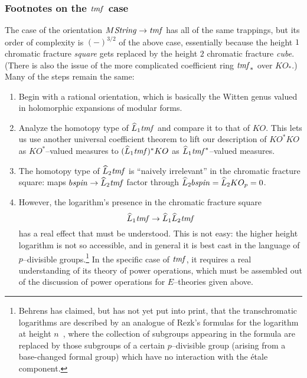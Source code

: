\subsubsection{Footnotes on the \(\mathit{tmf}\) case}

The case of the orientation \(M\mathit{String} \to \mathit{tmf}\) has all of the same trappings, but its order of complexity is \((-)^{3/2}\) of the above case, essentially because the height \(1\) chromatic fracture \emph{square} gets replaced by the height \(2\) chromatic fracture \emph{cube}.  (There is also the issue of the more complicated coefficient ring \(\mathit{tmf}_*\) over \(KO_*\).)  Many of the steps remain the same:
\begin{enumerate}
    \item Begin with a rational orientation, which is basically the Witten genus valued in holomorphic expansions of modular forms.
    \item Analyze the homotopy type of \(\widehat L_1 \mathit{tmf}\) and compare it to that of \(KO\).  This lets us use another universal coefficient theorem to lift our description of \(KO^* KO\) as \(KO^*\)--valued measures to \((\widehat L_1 \mathit{tmf})^* KO\) as \(\widehat L_1 \mathit{tmf}^*\)--valued measures.
    \item The homotopy type of \(\widehat L_2 \mathit{tmf}\) is ``naively irrelevant'' in the chromatic fracture square: maps \(b\mathit{spin} \to \widehat L_2 \mathit{tmf}\) factor through \(\widehat L_2 b\mathit{spin} = \widehat L_2 KO_p = 0\).
    \item However, the logarithm's presence in the chromatic fracture square \[\widehat L_1 \mathit{tmf} \to \widehat L_1 \widehat L_2 \mathit{tmf}\] has a real effect that must be understood.  This is not easy: the higher height logarithm is not so accessible, and in general it is best cast in the language of \(p\)--divisible groups.\footnote{Behrens has claimed, but has not yet put into print, that the transchromatic logarithms are described by an analogue of Rezk's formulas for the logarithm at height \(n\)~\cite[Subsections 1.10 and 1.12]{RezkLogarithm}, where the collection of subgroups appearing in the formula are replaced by those subgroups of a certain \(p\)--divisible group (arising from a base-changed formal group) which have no interaction with the \'etale component.}  In the specific case of \(\mathit{tmf}\), it requires a real understanding of its theory of power operations, which must be assembled out of the discussion of power operations for \(E\)--theories given above.

\end{enumerate}
